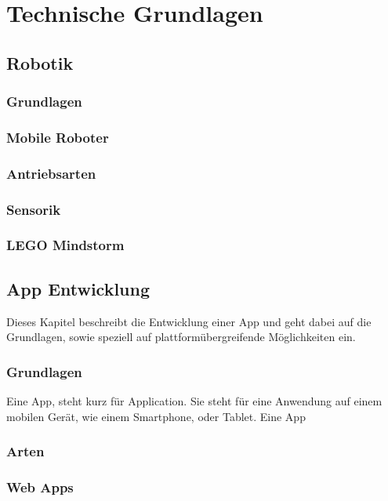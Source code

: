 \section{Technische Grundlagen}
\subsection{Robotik}

\subsubsection{Grundlagen}
\subsubsection{Mobile Roboter}
\subsubsection{Antriebsarten}
\subsubsection{Sensorik}
\subsubsection{LEGO Mindstorm}

\newpage
\subsection{App Entwicklung}

Dieses Kapitel beschreibt die Entwicklung einer App und geht dabei auf die Grundlagen, sowie speziell auf plattformübergreifende Möglichkeiten ein.

\subsubsection{Grundlagen}

Eine App, steht kurz für Application. Sie steht für eine Anwendung auf einem mobilen Gerät, wie einem Smartphone, oder Tablet. Eine App

\subsubsection{Arten}

\subsubsection*{Web Apps}
